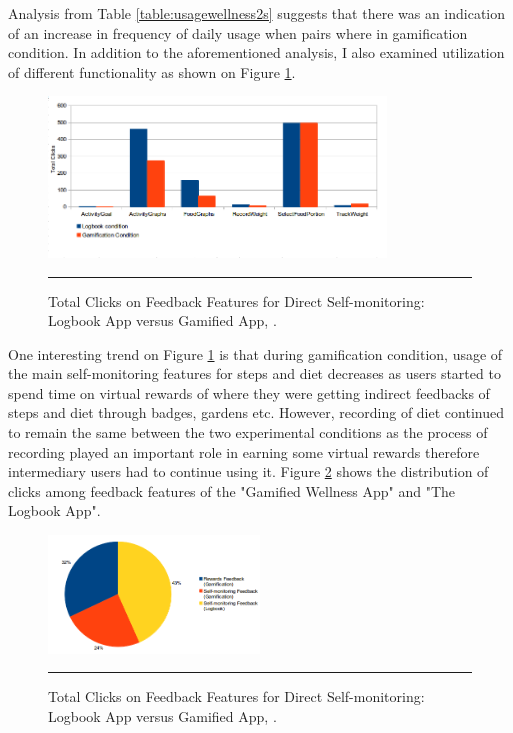 Analysis from Table \ref{table:usagewellness2s} suggests that there was an indication of an increase in frequency of daily usage when pairs where in gamification condition.\newline
In addition to the aforementioned analysis, I also examined utilization of different functionality as shown on Figure \ref{figure:self_monitoring_usage}.\newline
\begin{figure}[htbp]
  \centering
    \includegraphics[width=0.8\textwidth]{Figures/self_monitoring_usage.png}
    \rule{35em}{0.5pt}
  \caption{Total Clicks on Feedback Features for Direct Self-monitoring: Logbook App versus Gamified App, .}
  \label{figure:self_monitoring_usage}
\end{figure}\newline
One interesting trend on Figure \ref{figure:self_monitoring_usage} is that during gamification condition, usage of the main self-monitoring features for steps and diet decreases as users started to spend time on virtual rewards of where they were getting indirect feedbacks of steps and diet through badges, gardens etc. However, recording of diet continued to remain the same between the two experimental conditions as the process of recording played an important role in earning some virtual rewards therefore intermediary users had to continue using it. Figure \ref{figure:clicks_distr} shows the distribution of clicks among feedback features of the "Gamified Wellness App" and "The Logbook App".\newline 
\begin{figure}[htbp]
  \centering
    \includegraphics[width=0.5\textwidth]{Figures/clicks_distr.png}
    \rule{35em}{0.5pt}
  \caption{Total Clicks on Feedback Features for Direct Self-monitoring: Logbook App versus Gamified App, .}
  \label{figure:clicks_distr}
\end{figure}\newline
